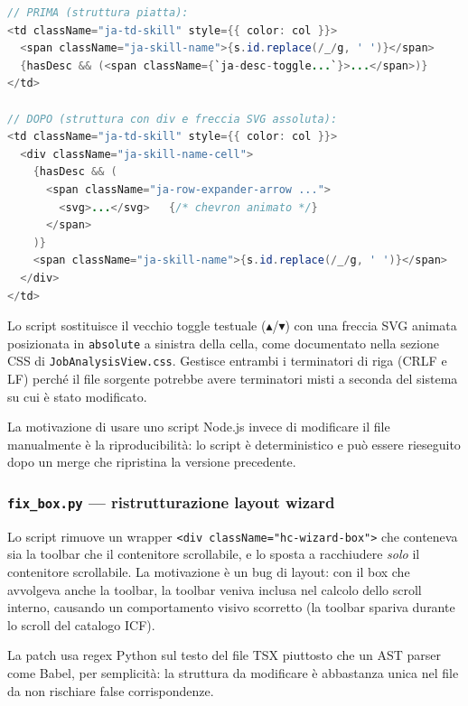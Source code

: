 \documentclass[a4paper,12pt]{article}
\begin{document}
\begin{lstlisting}[language=Java, caption={\texttt{replace.js} --- obiettivo della patch.}]
// PRIMA (struttura piatta):
<td className="ja-td-skill" style={{ color: col }}>
  <span className="ja-skill-name">{s.id.replace(/_/g, ' ')}</span>
  {hasDesc && (<span className={`ja-desc-toggle...`}>...</span>)}
</td>

// DOPO (struttura con div e freccia SVG assoluta):
<td className="ja-td-skill" style={{ color: col }}>
  <div className="ja-skill-name-cell">
    {hasDesc && (
      <span className="ja-row-expander-arrow ...">
        <svg>...</svg>   {/* chevron animato */}
      </span>
    )}
    <span className="ja-skill-name">{s.id.replace(/_/g, ' ')}</span>
  </div>
</td>
\end{lstlisting}

\noindent Lo script sostituisce il vecchio toggle testuale (\texttt{$\blacktriangle$}/\texttt{$\blacktriangledown$})
con una freccia SVG animata posizionata in \texttt{absolute} a sinistra
della cella, come documentato nella sezione CSS di
\texttt{JobAnalysisView.css}. Gestisce entrambi i terminatori di riga
(CRLF e LF) perch\'{e} il file sorgente potrebbe avere terminatori
misti a seconda del sistema su cui \`{e} stato modificato.

La motivazione di usare uno script Node.js invece di modificare
il file manualmente \`{e} la riproducibilit\`{a}: lo script \`{e}
deterministico e pu\`{o} essere rieseguito dopo un merge che ripristina
la versione precedente.

\subsubsection{\texttt{fix\_box.py} --- ristrutturazione layout wizard}

Lo script rimuove un wrapper \texttt{<div className="hc-wizard-box">}
che conteneva sia la toolbar che il contenitore scrollabile, e lo
sposta a racchiudere \textit{solo} il contenitore scrollabile. La
motivazione \`{e} un bug di layout: con il box che avvolgeva anche
la toolbar, la toolbar veniva inclusa nel calcolo dello scroll interno,
causando un comportamento visivo scorretto (la toolbar spariva durante
lo scroll del catalogo ICF).

La patch usa regex Python sul testo del file TSX piuttosto che
un AST parser come Babel, per semplicit\`{a}: la struttura da modificare
\`{e} abbastanza unica nel file da non rischiare false corrispondenze.
\end{document}
